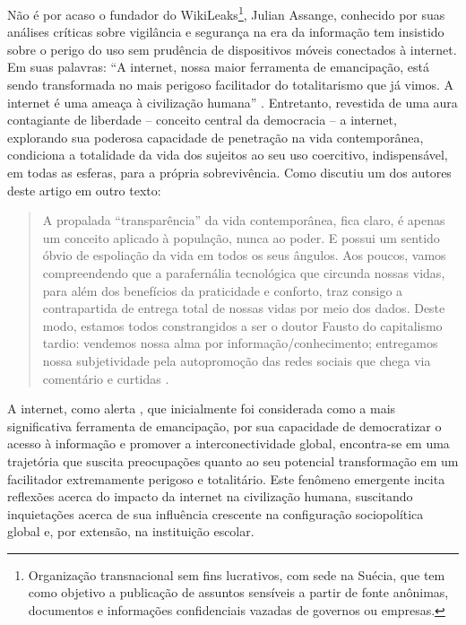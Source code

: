 \documentclass[portuguese]{textolivre}
\begin{document}
Não é por acaso o fundador do WikiLeaks\footnote{Organização transnacional sem fins lucrativos, com sede na Suécia, que tem como objetivo a publicação de assuntos sensíveis a partir de fonte anônimas, documentos e informações confidenciais vazadas de governos ou empresas.}, Julian Assange, conhecido por suas análises críticas sobre vigilância e segurança na era da informação tem insistido sobre o perigo do uso sem prudência de dispositivos móveis conectados à internet. Em suas palavras: “A internet, nossa maior ferramenta de emancipação, está sendo transformada no mais perigoso facilitador do totalitarismo que já vimos. A internet é uma ameaça à civilização humana” \cite[p. 21]{assange_2013-1}. Entretanto, revestida de uma aura contagiante de liberdade – conceito central da democracia – a internet, explorando sua poderosa capacidade de penetração na vida contemporânea, condiciona a totalidade da vida dos sujeitos ao seu uso coercitivo, indispensável, em todas as esferas, para a própria sobrevivência. Como discutiu um dos autores deste artigo em outro texto:

\begin{quote}
    A propalada “transparência” da vida contemporânea, fica claro, é apenas um conceito aplicado à população, nunca ao poder. E possui um sentido óbvio de espoliação da vida em todos os seus ângulos. Aos poucos, vamos compreendendo que a parafernália tecnológica que circunda nossas vidas, para além dos benefícios da praticidade e conforto, traz consigo a contrapartida de entrega total de nossas vidas por meio dos dados. Deste modo, estamos todos constrangidos a ser o doutor Fausto do capitalismo tardio: vendemos nossa alma por informação/conhecimento; entregamos nossa subjetividade pela autopromoção das redes sociais que chega via comentário e curtidas \cite{quiroga_o_2013}.
\end{quote}


A internet, como alerta \textcite{assange_2013-1}, que inicialmente foi considerada como a mais significativa ferramenta de emancipação, por sua capacidade de democratizar o acesso à informação e promover a interconectividade global, encontra-se em uma trajetória que suscita preocupações quanto ao seu potencial transformação em um facilitador extremamente perigoso e totalitário. Este fenômeno emergente incita reflexões acerca do impacto da internet na civilização humana, suscitando inquietações acerca de sua influência crescente na configuração sociopolítica global e, por extensão, na instituição escolar.
 
\end{document}
